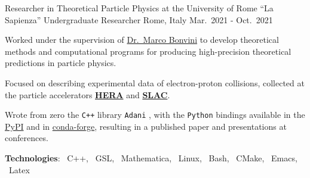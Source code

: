 \begin{cventries}
    \cventry
{Researcher in Theoretical Particle Physics at the University of Rome ``La Sapienza''}
{Undergraduate Researcher}
{Rome, Italy}
{Mar.\ 2021 - Oct.\ 2021}
{
      \begin{cvitems} %
        \item Worked under the supervision of \href{https://inspirehep.net/authors/1058479?ui-citation-summary=true}{Dr.\ Marco Bonvini} to develop theoretical methods and computational programs for producing high-precision theoretical predictions in particle physics.
        \item Focused on describing experimental data of electron-proton collisions, collected at the particle accelerators \href{https://en.wikipedia.org/wiki/HERA_(particle_accelerator)}{\textbf{HERA}} and \href{https://en.wikipedia.org/wiki/SLAC_National_Accelerator_Laboratory}{\textbf{SLAC}}.
        \item Wrote from zero the \texttt{C++} library \texttt{Adani} \href{https://github.com/niclaurenti/adani}{\githublogo}, with the \texttt{Python} bindings available in the \href{https://pypi.org/project/adani/}{PyPI} and in \href{https://anaconda.org/conda-forge/adani}{conda-forge}, resulting in a published paper and presentations at conferences.
        \item[] \textbf{\textcolor{awesome-red}{Tec}hnologies}: \cpplogo{}~C++, \gnulogo{}~GSL, \mathematicalogo{}~Mathematica, \linuxlogo{}~Linux, \bashlogo{}~Bash, \cmakelogo{}~CMake, \emacslogo{}~Emacs, \latexlogo{}~Latex
      \end{cvitems}
    }

\end{cventries}